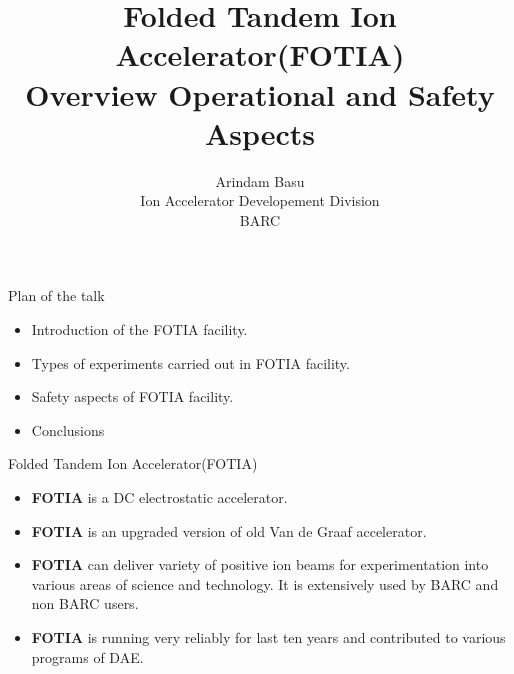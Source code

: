 \documentclass[11pt]{beamer}
\author{Arindam Basu \\ Ion Accelerator Developement Division\\ BARC}
\title{Folded Tandem Ion Accelerator(FOTIA)\\ Overview Operational and Safety Aspects}
\begin{document}
\begin{frame}
\titlepage
\end{frame}



\begin{frame}{Plan of the talk}

\begin{itemize}
\item Introduction of the FOTIA facility.
\item Types of experiments carried out in FOTIA facility.
\item Safety aspects of FOTIA facility.
\item Conclusions



\end{itemize}

\end{frame}





\begin{frame}{Folded Tandem Ion Accelerator(FOTIA)}

\begin{itemize}
\item \textbf{FOTIA} is a DC electrostatic accelerator.
\item \textbf{FOTIA} is an upgraded version of old Van de Graaf accelerator.
\item \textbf{FOTIA} can deliver variety of positive ion beams for experimentation into various areas of science and technology. It is extensively used by BARC and non BARC users.
\item \textbf{FOTIA} is running very reliably for last ten years and contributed to various programs of DAE.
 
\end{itemize}

\end{frame}
\end{document}
